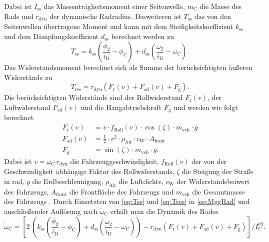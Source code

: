 Dabei ist $I_\mathrm{ss}$ das Massenträgheitsmoment einer Seitenwelle, $m_\mathrm{C}$ die Masse des Rads und $r_\mathrm{dyn}$ der dynamische Radradius. Desweiteren ist $T_\mathrm{ss}$ das von den Seitenwellen übertragene Moment und kann mit dem Steifigkeitskoeffizient $k_\mathrm{ss}$ und dem Dämpfungskoeffizient $d_\mathrm{ss}$ berechnet werden zu
\begin{equation}\label{eq:Tss}
T_\mathrm{ss} = k_\mathrm{ss}\left(\frac{\phi_2}{i_{\mathrm{D}}} - \phi_\mathrm{C}\right) + d_\mathrm{ss}\left(\frac{\omega_2}{i_{\mathrm{D}}} - \omega_\mathrm{C}\right).
\end{equation}
Das Widerstandsmoment berechnet sich als Summe der berücksichtigten äußeren Widerstände zu
\begin{equation}\label{eq:Tres}
T_\mathrm{res} = r_\mathrm{dyn}\left(F_\mathrm{r}(v) + F_\mathrm{ad}(v) + F_\mathrm{g}\right). 
\end{equation}
Die berücksichtigten Widerstände sind der Rollwiderstand $F_\mathrm{r}(v)$, der Luftwiderstand $F_\mathrm{ad}(v)$ und die Hangabtriebskraft $F_\mathrm{g}$ und werden wie folgt berechnet
\begin{subequations}
\begin{align}
F_\mathrm{r}(v) &= v \cdot f_\mathrm{Roll}(v)\cdot \cos\left(\zeta\right)\cdot m_\mathrm{veh}\cdot g \\
F_\mathrm{ad}(v) &= \frac{1}{2}\cdot v^2\cdot\rho_\mathrm{Air}\cdot c_\mathrm{W}\cdot A_\mathrm{front}\\
F_\mathrm{g} &= \sin\left(\zeta \right)\cdot m_\mathrm{veh}\cdot g.
\end{align}
\end{subequations}
Dabei ist $v = \omega_\mathrm{C}\,r_\mathrm{dyn}$ die Fahrzeuggeschwindigkeit, $f_\mathrm{Roll}(v)$ der von der Geschwindigkeit abhängige Faktor
des Rollwiderstands, $\zeta$ die Steigung der Straße in rad, $g$ die Erdbeschleunigung, $\rho_\mathrm{Air}$ die Luftdichte, $c_\mathrm{W}$ der Widerstandsbeiwert des Fahrzeugs, $A_\mathrm{front}$ die Frontfläche des
Fahrzeugs und $m_\mathrm{veh}$ die Gesamtmasse des Fahrzeugs \cite[S.~3ff]{Naunheimer.2007}.
Durch Einsetzten von \eqref{eq:Tss} und \eqref{eq:Tres} in \eqref{eq:MggRad} und anschließender Auflösung nach $\dot{\omega}_\mathrm{C}$ erhält man die Dynamik des Rades
\begin{equation}\label{eq:dynwc}
\dot{\omega}_\mathrm{C} = \left[ 2\,\left(k_\mathrm{ss}\left(\frac{\phi_2}{i_{\mathrm{D}}} - \phi_\mathrm{C}\right) + d_\mathrm{ss}\left(\frac{\omega_2}{i_{\mathrm{D}}} - \omega_\mathrm{C}\right)\right) - r_\mathrm{dyn}\left(F_\mathrm{r}(v) + F_\mathrm{ad}(v) + F_\mathrm{g}\right)\right]/I^\mathrm{eff}_\mathrm{C}.
\end{equation}
